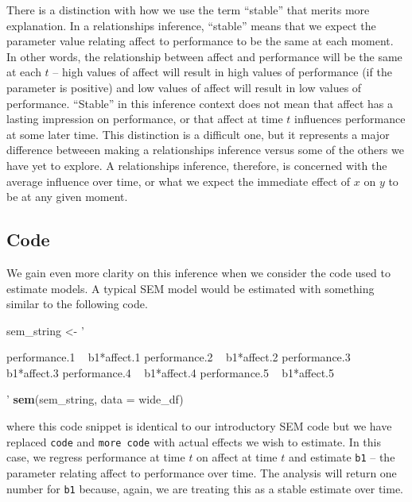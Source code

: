 \documentclass[english,,man]{apa6}
\newenvironment{Shaded}{\begin{snugshade}}{\end{snugshade}}
\newcommand{\DataTypeTok}[1]{\textcolor[rgb]{0.13,0.29,0.53}{#1}}
\newcommand{\KeywordTok}[1]{\textcolor[rgb]{0.13,0.29,0.53}{\textbf{#1}}}
\newcommand{\NormalTok}[1]{#1}
\newcommand{\StringTok}[1]{\textcolor[rgb]{0.31,0.60,0.02}{#1}}
\theoremstyle{definition}
\theoremstyle{definition}
\theoremstyle{definition}
\theoremstyle{remark}
\begin{document}
There is a distinction with how we use the term \enquote{stable} that
merits more explanation. In a relationships inference, \enquote{stable}
means that we expect the parameter value relating affect to performance
to be the same at each moment. In other words, the relationship between
affect and performance will be the same at each \(t\) -- high values of
affect will result in high values of performance (if the parameter is
positive) and low values of affect will result in low values of
performance. \enquote{Stable} in this inference context does not mean
that affect has a lasting impression on performance, or that affect at
time \(t\) influences performance at some later time. This distinction
is a difficult one, but it represents a major difference betweeen making
a relationships inference versus some of the others we have yet to
explore. A relationships inference, therefore, is concerned with the
average influence over time, or what we expect the immediate effect of
\(x\) on \(y\) to be at any given moment.

\hypertarget{code}{%
\subsection{Code}\label{code}}

We gain even more clarity on this inference when we consider the code
used to estimate models. A typical SEM model would be estimated with
something similar to the following code.

\begin{Shaded}
\begin{Highlighting}[]
\NormalTok{sem_string <-}\StringTok{ '}

\StringTok{      performance.1 ~ b1*affect.1}
\StringTok{      performance.2 ~ b1*affect.2}
\StringTok{      performance.3 ~ b1*affect.3}
\StringTok{      performance.4 ~ b1*affect.4}
\StringTok{      performance.5 ~ b1*affect.5}

\StringTok{'}
\KeywordTok{sem}\NormalTok{(sem_string, }\DataTypeTok{data =}\NormalTok{ wide_df)}
\end{Highlighting}
\end{Shaded}

\noindent where this code snippet is identical to our introductory SEM
code but we have replaced \texttt{code} and \texttt{more\ code} with
actual effects we wish to estimate. In this case, we regress performance
at time \(t\) on affect at time \(t\) and estimate \texttt{b1} -- the
parameter relating affect to performance over time. The analysis will
return one number for \texttt{b1} because, again, we are treating this
as a stable estimate over time.
\end{document}
